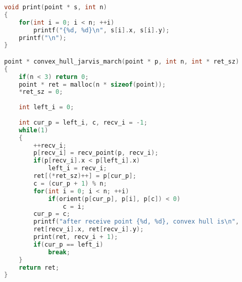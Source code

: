 \documentclass[12pt,border=4pt,multi]{article} %
\begin{document}
\begin{lstlisting}[language = c, mathescape = true]
void print(point * s, int n)
{
    for(int i = 0; i < n; ++i)
        printf("{%d, %d}\n", s[i].x, s[i].y);
    printf("\n");
}

point * convex_hull_jarvis_march(point * p, int n, int * ret_sz)
{
    if(n < 3) return 0;
    point * ret = malloc(n * sizeof(point));
    *ret_sz = 0;
    
    int left_i = 0;
    
    int cur_p = left_i, c, recv_i = -1;
    while(1)
    {
        ++recv_i;
        p[recv_i] = recv_point(p, recv_i);
        if(p[recv_i].x < p[left_i].x)
            left_i = recv_i;
        ret[(*ret_sz)++] = p[cur_p];
        c = (cur_p + 1) % n;
        for(int i = 0; i < n; ++i)
            if(orient(p[cur_p], p[i], p[c]) < 0)
                c = i;
        cur_p = c;
        printf("after receive point {%d, %d}, convex hull is\n",
        ret[recv_i].x, ret[recv_i].y);
        print(ret, recv_i + 1);
        if(cur_p == left_i)
            break;
    }
    return ret;
}
\end{lstlisting}
\end{document}
